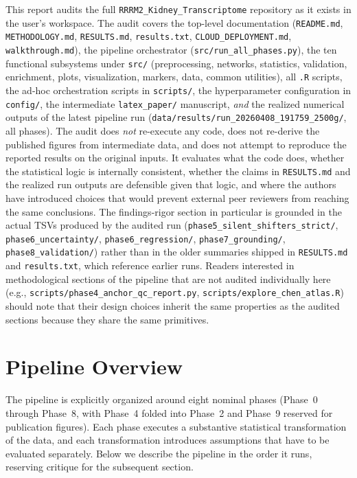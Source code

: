 \documentclass[11pt]{article}
\newcommand{\code}[1]{\texttt{#1}}
\begin{document}
This report audits the full \code{RRRM2\_Kidney\_Transcriptome} repository as it exists in the user's workspace. The audit covers the top-level documentation (\code{README.md}, \code{METHODOLOGY.md}, \code{RESULTS.md}, \code{results.txt}, \code{CLOUD\_DEPLOYMENT.md}, \code{walkthrough.md}), the pipeline orchestrator (\code{src/run\_all\_phases.py}), the ten functional subsystems under \code{src/} (preprocessing, networks, statistics, validation, enrichment, plots, visualization, markers, data, common utilities), all \code{.R} scripts, the ad-hoc orchestration scripts in \code{scripts/}, the hyperparameter configuration in \code{config/}, the intermediate \code{latex\_paper/} manuscript, \emph{and} the realized numerical outputs of the latest pipeline run (\code{data/results/run\_20260408\_191759\_2500g/}, all phases). The audit does \emph{not} re-execute any code, does not re-derive the published figures from intermediate data, and does not attempt to reproduce the reported results on the original inputs. It evaluates what the code does, whether the statistical logic is internally consistent, whether the claims in \code{RESULTS.md} and the realized run outputs are defensible given that logic, and where the authors have introduced choices that would prevent external peer reviewers from reaching the same conclusions. The findings-rigor section in particular is grounded in the actual TSVs produced by the audited run (\code{phase5\_silent\_shifters\_strict/}, \code{phase6\_uncertainty/}, \code{phase6\_regression/}, \code{phase7\_grounding/}, \code{phase8\_validation/}) rather than in the older summaries shipped in \code{RESULTS.md} and \code{results.txt}, which reference earlier runs. Readers interested in methodological sections of the pipeline that are not audited individually here (e.g., \code{scripts/phase4\_anchor\_qc\_report.py}, \code{scripts/explore\_chen\_atlas.R}) should note that their design choices inherit the same properties as the audited sections because they share the same primitives.

\section{Pipeline Overview}

The pipeline is explicitly organized around eight nominal phases (Phase~0 through Phase~8, with Phase~4 folded into Phase~2 and Phase~9 reserved for publication figures). Each phase executes a substantive statistical transformation of the data, and each transformation introduces assumptions that have to be evaluated separately. Below we describe the pipeline in the order it runs, reserving critique for the subsequent section.
\end{document}
